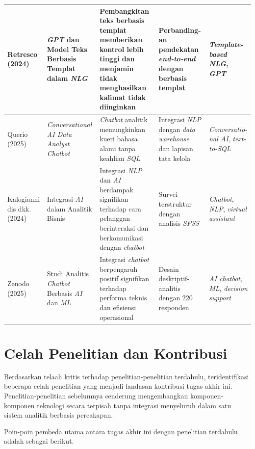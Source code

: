 \begin{longtable}{|p{2cm}|p{3cm}|p{3cm}|p{2cm}|p{2cm}|}
Retresco (2024) & \textit{GPT} dan Model Teks Berbasis Templat dalam \textit{NLG} & Pembangkitan teks berbasis templat memberikan kontrol lebih tinggi dan menjamin tidak menghasilkan kalimat tidak diinginkan & Perbanding- an pendekatan \textit{end-to-end} dengan berbasis templat & \textit{Template-based NLG}, \textit{GPT} \\
\hline

Querio (2025) & \textit{Conversational AI Data Analyst Chatbot} & \textit{Chatbot} analitik memungkinkan kueri bahasa alami tanpa keahlian \textit{SQL} & Integrasi \textit{NLP} dengan \textit{data warehouse} dan lapisan tata kelola & \textit{Conversatio- nal AI}, \textit{text-to-SQL} \\
\hline

Kalogianni dis dkk. (2024) & Integrasi \textit{AI} dalam Analitik Bisnis & Integrasi \textit{NLP} dan \textit{AI} berdampak signifikan terhadap cara pelanggan berinteraksi dan berkomunikasi dengan \textit{chatbot} & Survei terstruktur dengan analisis \textit{SPSS} & \textit{Chatbot}, \textit{NLP}, \textit{virtual assistant} \\
\hline

Zenodo (2025) & Studi Analitis \textit{Chatbot} Berbasis \textit{AI} dan \textit{ML} & Integrasi \textit{chatbot} berpengaruh positif signifikan terhadap performa teknis dan efisiensi operasional & Desain deskriptif-analitis dengan 220 responden & \textit{AI chatbot}, \textit{ML}, \textit{decision support} \\
\hline

\end{longtable}

\section{Celah Penelitian dan Kontribusi}

Berdasarkan telaah kritis terhadap penelitian-penelitian terdahulu, teridentifikasi beberapa celah penelitian yang menjadi landasan kontribusi tugas akhir ini. Penelitian-penelitian sebelumnya cenderung mengembangkan komponen-komponen teknologi secara terpisah tanpa integrasi menyeluruh dalam satu sistem analitik berbasis percakapan.

Poin-poin pembeda utama antara tugas akhir ini dengan penelitian terdahulu adalah sebagai berikut.

